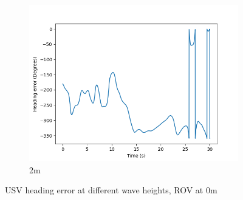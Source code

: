 \documentclass[class=article, crop=false]{standalone}
\begin{document}
\begin{figure}
\begin{subfigure}[b]{0.48\textwidth}
        \centering
        \includegraphics{scenario1/rov-0m/2.0m/usv_heading_error_controlled}
        \caption{2m}
        \label{}
    \end{subfigure}

    \caption{USV heading error at different wave heights, ROV at 0m}
\end{figure}
\end{document}
